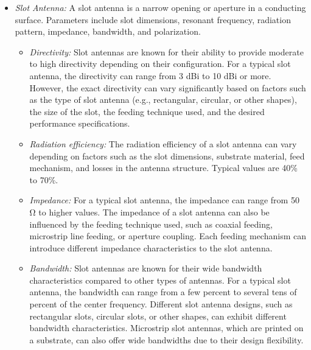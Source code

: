 \documentclass[11pt,a4paper]{article}
\renewcommand{\ohm}{{\mathrm{\Omega}}}
\begin{document}
\begin{itemize}
    \item \emph{Slot Antenna:} A slot antenna is a narrow opening or aperture in a conducting surface. Parameters include slot dimensions, resonant frequency, radiation pattern, impedance, bandwidth, and polarization.
    \begin{itemize}
        \item \emph{Directivity:} Slot antennas are known for their ability to provide moderate to high directivity depending on their configuration. For a typical slot antenna, the directivity can range from 3 dBi to 10 dBi or more. However, the exact directivity can vary significantly based on factors such as the type of slot antenna (e.g., rectangular, circular, or other shapes), the size of the slot, the feeding technique used, and the desired performance specifications.
        \item \emph{Radiation efficiency:} The radiation efficiency of a slot antenna can vary depending on factors such as the slot dimensions, substrate material, feed mechanism, and losses in the antenna structure. Typical values are 40\% to 70\%.
        \item \emph{Impedance:} For a typical slot antenna, the impedance can range from 50 $\ohm$ to higher values. The impedance of a slot antenna can also be influenced by the feeding technique used, such as coaxial feeding, microstrip line feeding, or aperture coupling. Each feeding mechanism can introduce different impedance characteristics to the slot antenna.
        \item \emph{Bandwidth:} Slot antennas are known for their wide bandwidth characteristics compared to other types of antennas. For a typical slot antenna, the bandwidth can range from a few percent to several tens of percent of the center frequency. Different slot antenna designs, such as rectangular slots, circular slots, or other shapes, can exhibit different bandwidth characteristics. Microstrip slot antennas, which are printed on a substrate, can also offer wide bandwidths due to their design flexibility.
    \end{itemize}
    

\end{itemize}
\end{document}
